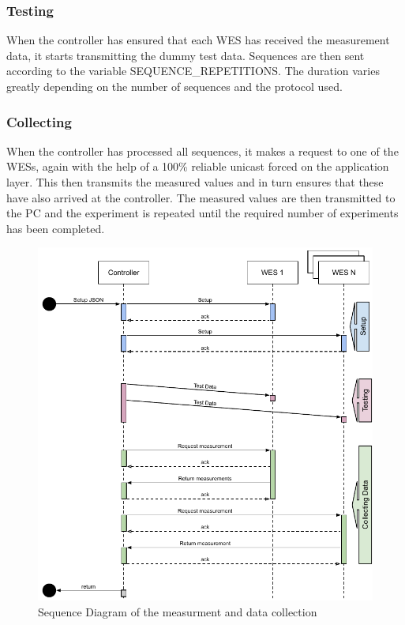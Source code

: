 \subsubsection*{Testing}
When the controller has ensured that each WES has received the measurement data, it starts transmitting the dummy test data.
Sequences are then sent according to the variable SEQUENCE\_REPETITIONS.
The duration varies greatly depending on the number of sequences and the protocol used.
\subsubsection*{Collecting}
When the controller has processed all sequences, it makes a request to one of the WESs, 
again with the help of a 100\% reliable unicast forced on the application layer.
This then transmits the measured values and in turn ensures that these have also arrived at the controller.
The measured values are then transmitted to the PC and the experiment is repeated until the required number of experiments has been completed.

\begin{figure}[h]
	\centering
	\includegraphics[scale=0.9]{figures/sequence_diagram_drive.pdf}
	\caption{Sequence Diagram of the measurment and data collection}
	\label{fig:sequenceDiagram}
\end{figure}

